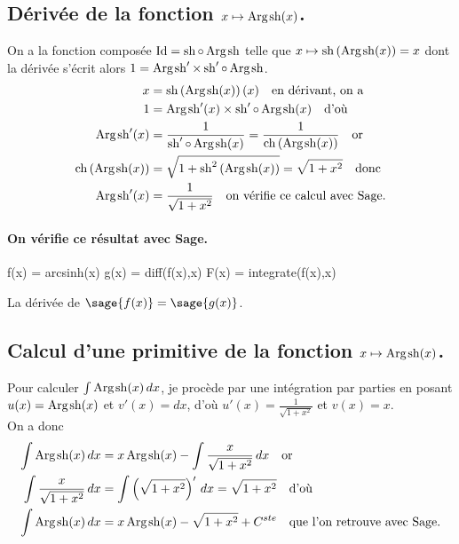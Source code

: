 \documentclass[a4paper,landscape,17pt]{extreport} %
\def\Id{\ensuremath{\mathrm{Id}}}
\renewcommand{\sinh}{\mathop{\mathrm{sh}}}
\renewcommand{\cosh}{\mathop{\mathrm{ch}}}
\renewcommand{\arg}{\mathop{\mathrm{Arg}}}
\begin{document}
\subsection{Dérivée de la fonction $x \mapsto \arg\mspace{-1mu}\sinh(x)$.\label{argsinh}}
On a la fonction composée $\Id = \sinh \circ \arg\mspace{-1mu}\sinh$ telle que $x\mapsto\sinh\left(\arg\mspace{-1mu}\sinh(x)\right)=x$ dont la dérivée s'écrit alors $1= \arg\mspace{-1mu}\sinh\nolimits' \times \sinh\nolimits'\circ\arg\mspace{-1mu}\sinh$.
\begin{align*}
x & =\sinh\left(\arg\mspace{-1mu}\sinh(x)\right)(x) \quad \textrm{en dérivant, on a}\\
1 & = \arg\mspace{-1mu}\sinh\nolimits'(x) \times \sinh\nolimits'\circ\arg\mspace{-1mu}\sinh(x) \quad \textrm{d'où}\\
\arg\mspace{-1mu}\sinh\nolimits'(x) & =\frac{1}{ \sinh\nolimits'\circ\arg\mspace{-1mu}\sinh(x)}=\frac{1}{ \cosh\left(\arg\mspace{-1mu}\sinh(x)\right)}\quad \textrm{or}\\
\cosh\left(\arg\mspace{-1mu}\sinh(x)\right) & = \sqrt{1+\sinh\nolimits^2\left(\arg\mspace{-1mu}\sinh(x)\right)}=\sqrt{1+x^2}\quad \textrm{donc}\\
\arg\mspace{-1mu}\sinh\nolimits'(x) & = \frac{1}{ \sqrt{1+x^2}}\quad \textrm{on vérifie ce calcul avec Sage.}
\end{align*}


\paragraph{On vérifie ce résultat avec Sage.}



\begin{sageblock}
    f(x) = arcsinh(x)
    g(x) = diff(f(x),x)
    F(x) = integrate(f(x),x)
\end{sageblock}

La dérivée de $\sage{f(x)} = \sage{g(x)} $.


\subsection{Calcul d'une primitive de la fonction  $x \mapsto \arg\mspace{-1mu}\sinh(x)$.}

Pour calculer $\int \arg\mspace{-1mu}\sinh(x) \, dx$, je procède par une intégration par parties en posant $u(x) = \arg\mspace{-1mu}\sinh(x)$ et $v'(x) = dx$, d'où $u'(x) = \frac{1}{ \sqrt{1+x^2}}$ et $ v(x) = x $. \\
On a donc
\begin{align*}
\int \arg\mspace{-1mu}\sinh(x) \, dx & = x \arg\mspace{-1mu}\sinh(x) - \int \frac{x}{ \sqrt{1+x^2}} \, dx \quad \textrm{or}\\
\int \frac{x}{ \sqrt{1+x^2}} \, dx & = \int \left(\sqrt{1+x^2}\right)' \, dx = \sqrt{1+x^2}  \quad \textrm{d'où}\\
\int \arg\mspace{-1mu}\sinh(x) \, dx & = x \arg\mspace{-1mu}\sinh(x) - \sqrt{1+x^2} + C^{ste} \quad \textrm{que l'on retrouve avec Sage.}
\end{align*}
\end{document}
